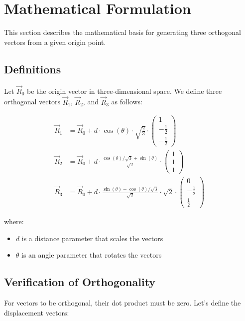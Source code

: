 \section{Mathematical Formulation}

This section describes the mathematical basis for generating three orthogonal vectors from a given origin point.

\subsection{Definitions}

Let $\vec{R}_0$ be the origin vector in three-dimensional space. We define three orthogonal vectors $\vec{R}_1$, $\vec{R}_2$, and $\vec{R}_3$ as follows:

\begin{align}
\vec{R}_1 &= \vec{R}_0 + d \cdot \cos(\theta) \cdot \sqrt{\frac{2}{3}} \cdot \begin{pmatrix} 1 \\ -\frac{1}{2} \\ -\frac{1}{2} \end{pmatrix} \\
\vec{R}_2 &= \vec{R}_0 + d \cdot \frac{\cos(\theta)/\sqrt{3} + \sin(\theta)}{\sqrt{2}} \cdot \begin{pmatrix} 1 \\ 1 \\ 1 \end{pmatrix} \\
\vec{R}_3 &= \vec{R}_0 + d \cdot \frac{\sin(\theta) - \cos(\theta)/\sqrt{3}}{\sqrt{2}} \cdot \sqrt{2} \cdot \begin{pmatrix} 0 \\ -\frac{1}{2} \\ \frac{1}{2} \end{pmatrix}
\end{align}

where:
\begin{itemize}
    \item $d$ is a distance parameter that scales the vectors
    \item $\theta$ is an angle parameter that rotates the vectors
\end{itemize}

\subsection{Verification of Orthogonality}

For vectors to be orthogonal, their dot product must be zero. Let's define the displacement vectors:

